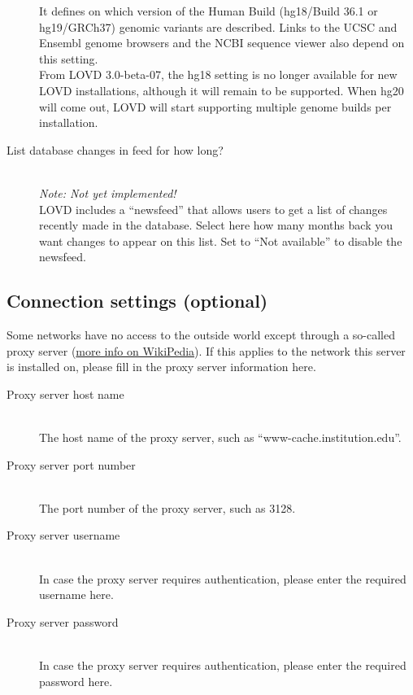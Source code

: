 \begin{description}
  It defines on which version of the Human Build (hg18/Build 36.1 or hg19/GRCh37) genomic variants are described.
  Links to the UCSC and Ensembl genome browsers and the NCBI sequence viewer also depend on this setting.
  \\
  From LOVD 3.0-beta-07, the hg18 setting is no longer available for new LOVD installations,
   although it will remain to be supported.
  When hg20 will come out, LOVD will start supporting multiple genome builds per installation.
  \item[List database changes in feed for how long?] \hfill \\
  \emph{Note: Not yet implemented!}
  \\
  LOVD includes a ``newsfeed'' that allows users to get a list of changes recently made in the database.
  Select here how many months back you want changes to appear on this list.
  Set to ``Not available'' to disable the newsfeed.
\end{description}



\subsection{Connection settings (optional)}
Some networks have no access to the outside world except through a so-called proxy server
 (\href{http://en.wikipedia.org/wiki/Proxy_server#Forward_proxies}{more info on WikiPedia}).
If this applies to the network this server is installed on, please fill in the proxy server information here.
\begin{description}
  \item[Proxy server host name] \hfill \\
  The host name of the proxy server, such as ``www-cache.institution.edu''.
  \item[Proxy server port number] \hfill \\
  The port number of the proxy server, such as 3128.
  \item[Proxy server username] \hfill \\
  In case the proxy server requires authentication, please enter the required username here.
  \item[Proxy server password] \hfill \\
  In case the proxy server requires authentication, please enter the required password here.
\end{description}



\pagebreak[4] %
